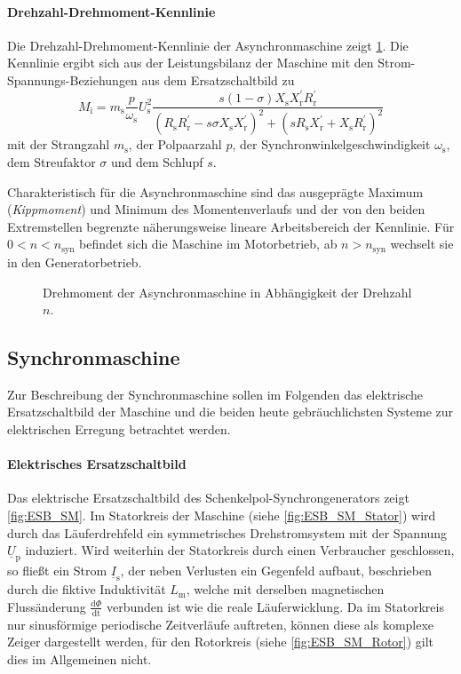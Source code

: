 \paragraph{Drehzahl-Drehmoment-Kennlinie}
Die Drehzahl-Drehmoment-Kennlinie der Asynchronmaschine zeigt \cref{fig:KennlinieASM}. Die Kennlinie ergibt sich aus der Leistungsbilanz der Maschine mit den Strom-Spannungs-Beziehungen aus dem Ersatzschaltbild zu \begin{equation}
    M_{\mathrm{i}}=m_{\mathrm{s}} \frac{p}{\omega_{\mathrm{s}}} U_{\mathrm{s}}^{2} \frac{s(1-\sigma) X_{\mathrm{s}} X_{\mathrm{r}}^{\prime} R_{\mathrm{r}}^{\prime}}{\left(R_{\mathrm{s}} R_{\mathrm{r}}^{\prime}-s \sigma X_{\mathrm{s}} X_{\mathrm{r}}^{\prime}\right)^{2}+\left(s R_{\mathrm{s}} X_{\mathrm{r}}^{\prime}+X_{\mathrm{s}} R_{\mathrm{r}}^{\prime}\right)^{2}}
\end{equation} mit der Strangzahl $m_{\mathrm{s}}$, der Polpaarzahl $p$, der Synchronwinkelgeschwindigkeit $\omega_{\mathrm{s}}$, dem Streufaktor $\sigma$ und dem Schlupf $s$.

Charakteristisch für die Asynchronmaschine sind das ausgeprägte Maximum (\emph{Kippmoment}) und Minimum des Momentenverlaufs und der von den beiden Extremstellen begrenzte näherungsweise lineare Arbeitsbereich der Kennlinie. Für $0 < n < n_{\mathrm{syn}}$ befindet sich die Maschine im Motorbetrieb, ab $n > n_{\mathrm{syn}}$ wechselt sie in den Generatorbetrieb.

\begin{figure}
    \centering
    
    \caption{Drehmoment der Asynchronmaschine in Abhängigkeit der Drehzahl $n$. }
    \label{fig:KennlinieASM}
\end{figure}

\subsection{Synchronmaschine}
\label{sec:Synchronmaschine}
Zur Beschreibung der Synchronmaschine sollen im Folgenden das elektrische Ersatzschaltbild der Maschine und die beiden heute gebräuchlichsten Systeme zur elektrischen Erregung betrachtet werden.
\paragraph{Elektrisches Ersatzschaltbild}
Das elektrische Ersatzschaltbild des Schenkelpol-Syn\-chron\-ge\-ne\-ra\-tors zeigt \cref{fig:ESB_SM}. Im Statorkreis der Maschine (siehe \cref{fig:ESB_SM_Stator}) wird durch das Läuferdrehfeld ein symmetrisches Drehstromsystem mit der Spannung $\underline{U}_{\mathrm{p}}$ induziert. Wird weiterhin der Statorkreis durch einen Verbraucher geschlossen, so fließt ein Strom $\underline{I}_{\mathrm{s}}$, der neben Verlusten ein Gegenfeld aufbaut, beschrieben durch die fiktive Induktivität $L_{\mathrm{m}}$, welche mit derselben magnetischen Flussänderung $\frac{\mathrm{d} \Phi}{\mathrm{dt}}$ verbunden ist wie die reale Läuferwicklung. Da im Statorkreis nur sinusförmige periodische Zeitverläufe auftreten, können diese als komplexe Zeiger dargestellt werden, für den Rotorkreis (siehe \cref{fig:ESB_SM_Rotor}) gilt dies im Allgemeinen nicht.

